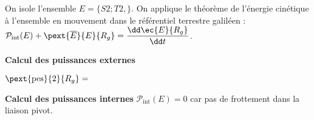 \else
\fi

\ifprof

	 On isole l'ensemble $E=\{S2 ; T2,\}$. On applique le théorème de l’énergie cinétique à l’ensemble en mouvement dans le référentiel terrestre galiléen : 
	 $\mathcal{P}_{\text{int}}(E)+\pext{\overline{E}}{E}{R_g} = \dfrac{\dd \ec{E}{R_g} }{\dd t}$.

\textbf{Calcul des puissances externes}

$\pext{\text{pes}}{2}{R_g} = $


\textbf{	Calcul des puissances internes}
 $\mathcal{P}_{\text{int}}(E)=0$ car pas de frottement dans la liaison pivot.


\else
\fi






\ifprof
\else


\fi